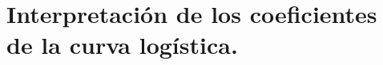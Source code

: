 %
%
%
%


\section{Interpretación de los coeficientes de la curva logística.}
\label{cap13:sec:CurvasLogisticasPosibilidadesLogit}

